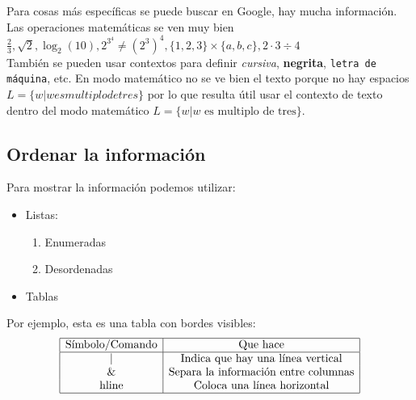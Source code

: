 \documentclass[12pt]{article}
\begin{document}
Para cosas más específicas se puede buscar en Google, hay mucha información. Las operaciones matemáticas se ven muy bien $\frac{2}{3}, \sqrt{2}, \log_{2}(10), 2^{3^{4}} \neq (2^{3})^{4}, \{1, 2, 3\} \times \{a, b, c\}, 2 \cdot 3 \div 4$\\

También se pueden usar contextos para definir \textit{cursiva}, \textbf{negrita}, \texttt{letra de máquina}, etc. En modo matemático no se ve bien el texto porque no hay espacios $L = \{ w | w es multiplo de tres\}$ por lo que resulta útil usar el contexto de texto dentro del modo matemático $L = \{ w | w \text{ es multiplo de tres}\}$.

\subsection*{Ordenar la información}
Para mostrar la información podemos utilizar:
\begin{itemize}
		        \item Listas:
		        \begin{enumerate}
		            \item Enumeradas
		            \item Desordenadas
		        \end{enumerate}
		        \item Tablas
	        \end{itemize}

Por ejemplo, esta es una tabla con bordes visibles:
		    \[
		    \begin{array}{|c|c|}
		    \hline
		         \text{Símbolo/Comando} & \text{Que hace}  \\ \hline
		         \text{|} & \text{Indica que hay una línea vertical} \\
		         \text{\&} & \text{Separa la información entre columnas} \\
		         \text{hline} & \text{Coloca una línea horizontal} \\
		         \hline
		    \end{array}
		    \]
\newpage
\end{document}
